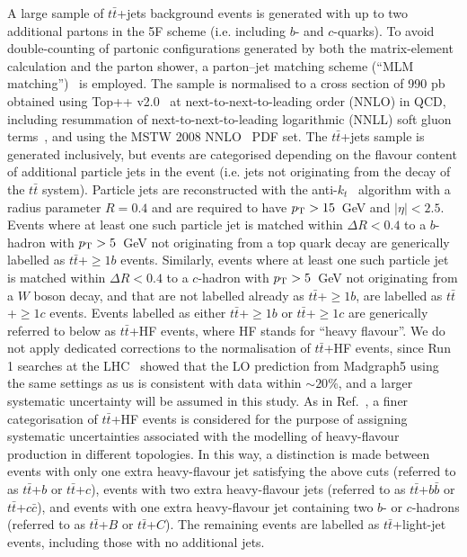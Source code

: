 \documentclass[preprintnumbers,superscriptaddress,nofootinbib,aps,prd,floatfix]{revtex4}
\newcommand{\pt}{p_{\rm{T}}}
\newcommand{\ttbar}{\ensuremath{t\bar{t}}}
\begin{document}
A large sample of $\ttbar$+jets background events is generated with up to two additional partons  in the 5F scheme 
(i.e. including $b$- and $c$-quarks). To avoid double-counting of partonic configurations generated by both the 
matrix-element  calculation and the parton shower,  a parton--jet matching scheme (``MLM matching'')~\cite{Mangano:2001xp} 
is employed. The sample is normalised to a cross section of 990 pb obtained using {\sc Top++} v2.0~\cite{Czakon:2011xx} 
at next-to-next-to-leading order (NNLO) in QCD, including resummation of next-to-next-to-leading logarithmic (NNLL) soft gluon 
terms~\cite{Cacciari:2011hy,Baernreuther:2012ws,Czakon:2012zr,Czakon:2012pz,Czakon:2013goa}, 
and using the MSTW 2008 NNLO~\cite{Martin:2009iq,Martin:2009bu} PDF set.
The $\ttbar$+jets sample is generated inclusively, but events are categorised depending
on the flavour content of additional particle jets in the event (i.e. jets not originating from
the decay of the $\ttbar$ system). Particle jets are reconstructed with the anti-$k_t$~\cite{Cacciari:2008gp,Cacciari:2005hq,Cacciari:2011ma} 
algorithm with a radius parameter $R=0.4$ and are required to have $\pt>15$~GeV and
$|\eta|<2.5$. Events where at least one such particle jet is matched within $\Delta R<0.4$ to a $b$-hadron
with $\pt>5$~GeV not originating from a top quark decay are generically labelled as $\ttbar$+$\geq$$1b$ events.
Similarly, events where at least one such particle jet is matched within $\Delta R<0.4$ to a $c$-hadron
with $\pt>5$~GeV not originating from a $W$ boson decay, and that are not labelled already as $\ttbar$+$\geq$$1b$, 
are labelled as $\ttbar$+$\geq$$1c$  events. Events labelled as either $\ttbar$+$\geq$$1b$  or
$\ttbar$+$\geq$$1c$ are generically referred to below as $\ttbar$+HF events, where HF stands for ``heavy flavour''.
We do not apply dedicated corrections to the normalisation of $\ttbar$+HF events, since Run 1 searches at the LHC~\cite{Aad:2015gra} 
showed that the LO prediction from {\sc Madgraph5} using the same settings as us is consistent with data within $\sim 20\%$,
and a larger systematic uncertainty will be assumed in this study.
As in Ref.~\cite{Aad:2015gra}, a finer categorisation of $\ttbar$+HF events is considered for the purpose of assigning systematic uncertainties
associated with the modelling of heavy-flavour production in different topologies. In this way, a distinction is
made between events with only one extra heavy-flavour jet satisfying the above cuts (referred to as $\ttbar$+$b$ or $\ttbar$+$c$),
events with two extra heavy-flavour jets (referred to as $\ttbar$+$b\bar{b}$ or $\ttbar$+$c\bar{c}$), and events
with one extra heavy-flavour jet containing two $b$- or $c$-hadrons  (referred to as $\ttbar$+$B$ or $\ttbar$+$C$).
The remaining events are labelled as $\ttbar$+light-jet events, including those with no additional jets. 
\end{document}
